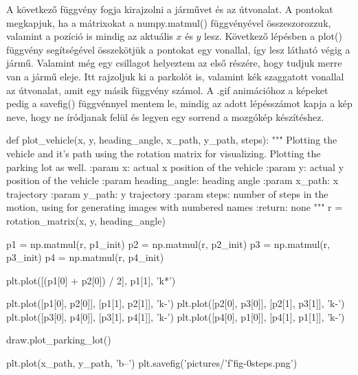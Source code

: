 A következő függvény fogja kirajzolni a járművet és az útvonalat. A pontokat megkapjuk, ha a mátrixokat a numpy.matmul() függvényével összeszorozzuk, valamint a pozíció is mindig az aktuális $ x $ és $ y $ lesz. Következő lépésben a plot() függvény segítségével összekötjük a pontokat egy vonallal, így lesz látható végig a jármű. Valamint még egy csillagot helyeztem az első részére, hogy tudjuk merre van a jármű eleje. Itt rajzoljuk ki a parkolót is, valamint kék szaggatott vonallal az útvonalat, amit egy másik függvény számol. A .gif animációhoz a képeket pedig a savefig() függvénnyel mentem le, mindig az adott lépésszámot kapja a kép neve, hogy ne íródjanak felül és legyen egy sorrend a mozgókép készítéshez.
\begin{python}
def plot_vehicle(x, y, heading_angle, x_path, y_path, steps):
    """
    Plotting the vehicle and it's path using the rotation matrix
    for visualizing.
    Plotting the parking lot as well.
    :param x: actual x position of the vehicle
    :param y: actual y position of the vehicle
    :param heading_angle: heading angle
    :param x_path: x trajectory
    :param y_path: y trajectory
    :param steps: number of steps in the motion, using for generating
    images with numbered names
    :return: none
    """
    r = rotation_matrix(x, y, heading_angle)

    p1 = np.matmul(r, p1_init)
    p2 = np.matmul(r, p2_init)
    p3 = np.matmul(r, p3_init)
    p4 = np.matmul(r, p4_init)

    plt.plot([(p1[0] + p2[0]) / 2], p1[1], 'k*')

    plt.plot([p1[0], p2[0]], [p1[1], p2[1]], 'k-')
    plt.plot([p2[0], p3[0]], [p2[1], p3[1]], 'k-')
    plt.plot([p3[0], p4[0]], [p3[1], p4[1]], 'k-')
    plt.plot([p4[0], p1[0]], [p4[1], p1[1]], 'k-')

    draw.plot_parking_lot()

    plt.plot(x_path, y_path, 'b--')
    plt.savefig('pictures/'f'fig-0{steps}.png')
\end{python}

\bigskip

